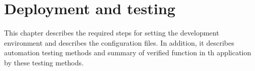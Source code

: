 \chapter{Deployment and testing}\label{ch:mobile-application-implementation}

This chapter describes the required steps for setting the development environment and describes the configuration files.
In addition, it describes automation testing methods and summary of verified function in th application by these testing methods.






